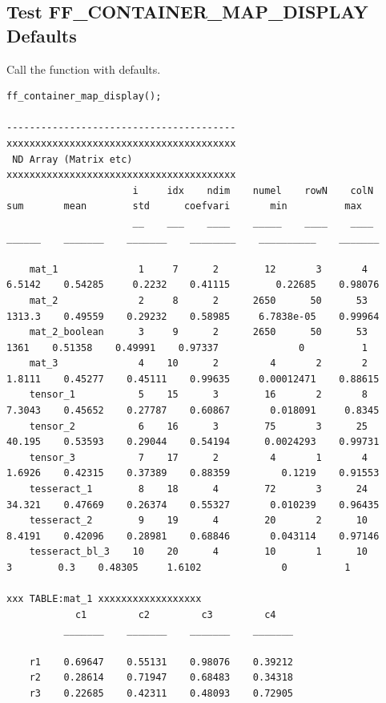 \documentclass[
]{book}
\begin{document}
\hypertarget{test-ff_container_map_display-defaults}{%
\subsection{Test FF\_CONTAINER\_MAP\_DISPLAY Defaults}\label{test-ff_container_map_display-defaults}}

Call the function with defaults.

\begin{verbatim}
ff_container_map_display();

----------------------------------------
xxxxxxxxxxxxxxxxxxxxxxxxxxxxxxxxxxxxxxxx
 ND Array (Matrix etc)
xxxxxxxxxxxxxxxxxxxxxxxxxxxxxxxxxxxxxxxx
                      i     idx    ndim    numel    rowN    colN     sum       mean        std      coefvari       min          max  
                      __    ___    ____    _____    ____    ____    ______    _______    _______    ________    __________    _______

    mat_1              1     7      2        12       3       4     6.5142    0.54285     0.2232    0.41115        0.22685    0.98076
    mat_2              2     8      2      2650      50      53     1313.3    0.49559    0.29232    0.58985     6.7838e-05    0.99964
    mat_2_boolean      3     9      2      2650      50      53       1361    0.51358    0.49991    0.97337              0          1
    mat_3              4    10      2         4       2       2     1.8111    0.45277    0.45111    0.99635     0.00012471    0.88615
    tensor_1           5    15      3        16       2       8     7.3043    0.45652    0.27787    0.60867       0.018091     0.8345
    tensor_2           6    16      3        75       3      25     40.195    0.53593    0.29044    0.54194      0.0024293    0.99731
    tensor_3           7    17      2         4       1       4     1.6926    0.42315    0.37389    0.88359         0.1219    0.91553
    tesseract_1        8    18      4        72       3      24     34.321    0.47669    0.26374    0.55327       0.010239    0.96435
    tesseract_2        9    19      4        20       2      10     8.4191    0.42096    0.28981    0.68846       0.043114    0.97146
    tesseract_bl_3    10    20      4        10       1      10          3        0.3    0.48305     1.6102              0          1

xxx TABLE:mat_1 xxxxxxxxxxxxxxxxxx
            c1         c2         c3         c4   
          _______    _______    _______    _______

    r1    0.69647    0.55131    0.98076    0.39212
    r2    0.28614    0.71947    0.68483    0.34318
    r3    0.22685    0.42311    0.48093    0.72905


\end{verbatim}
\end{document}
